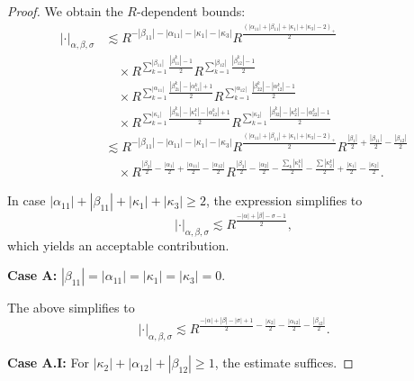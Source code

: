 \documentclass{amsart}
\theoremstyle{definition}
\begin{document}
\begin{proof}
We obtain the $R$-dependent bounds:
\begin{equation}
\label{eq:PhaseFunctionBound}
\begin{split}
|\cdot|_{\alpha,\beta,\sigma} &\lesssim R^{-|\beta_{11}| - |\alpha_{11}| - |\kappa_1| - |\kappa_3|}  R^{\frac{(|\alpha_{11}| + |\beta_{11}| + |\kappa_1| + |\kappa_3| - 2)_+}{2}} \\
&\quad \times R^{\sum_{k=1}^{|\beta_{11}|} \frac{|\beta_{11}^k| - 1}{2}} R^{\sum_{k=1}^{|\beta_{12}|} \frac{|\beta_{12}^k|-1}{2}} \\
&\quad \times R^{\sum_{k=1}^{|\alpha_{11}|} \frac{|\beta_{21}^k| - |\alpha_{11}^k| + 1}{2}} R^{\sum_{k=1}^{|\alpha_{12}|} \frac{|\beta_{22}^k|- |\alpha_{12}^k| - 1}{2}} \\
&\quad \times R^{\sum_{k=1}^{|\kappa_1|} \frac{|\beta_{31}^k| - |\kappa_1^k| - |\alpha_{12}^k| + 1}{2}} 
 R^{\sum_{k=1}^{|\kappa_2|} \frac{|\beta_{32}^k| - |\kappa_2^k| - |\alpha_{22}^k| - 1}{2}} \\
&\lesssim R^{-|\beta_{11}| - |\alpha_{11}| - |\kappa_1| - |\kappa_3|} R^{\frac{(|\alpha_{11}| + |\beta_{11}| + |\kappa_1| + |\kappa_3| - 2)_+}{2}} R^{\frac{|\beta_1|}{2} + \frac{|\beta_{11}|}{2} - \frac{|\beta_{12}|}{2}}  \\
&\quad \times R^{\frac{|\beta_2|}{2} - \frac{|\alpha_1|}{2} + \frac{|\alpha_{11}|}{2} - \frac{|\alpha_{12}|}{2}} R^{\frac{|\beta_3|}{2}-\frac{|\alpha_2|}{2} - \frac{\sum_k |\kappa_1^k|}{2} - \frac{\sum |\kappa_2^k|}{2} +  \frac{|\kappa_1|}{2}-\frac{|\kappa_2|}{2}}.
\end{split}
\end{equation}

In case $|\alpha_{11}|+|\beta_{11}| + |\kappa_1| + |\kappa_3| \geq 2$, the expression simplifies to
\begin{equation*}
| \cdot |_{\alpha,\beta,\sigma} \lesssim R^{\frac{-|\alpha|+|\beta|-\sigma-1}{2}},
\end{equation*}
which yields an acceptable contribution.

\smallskip

\textbf{Case A:} $|\beta_{11}|=|\alpha_{11}|=|\kappa_1| = |\kappa_3|= 0$.

The above simplifies to
\begin{equation*}
| \cdot |_{\alpha,\beta,\sigma} \lesssim R^{\frac{-|\alpha|+|\beta|-|\sigma|+1}{2} - \frac{|\kappa_2|}{2} - \frac{|\alpha_{12}|}{2} - \frac{|\beta_{12}|}{2}}.
\end{equation*}

\textbf{Case A.I:} For $|\kappa_2| + |\alpha_{12}| + |\beta_{12}| \geq 1$, the estimate suffices.


\end{proof}
\end{document}
